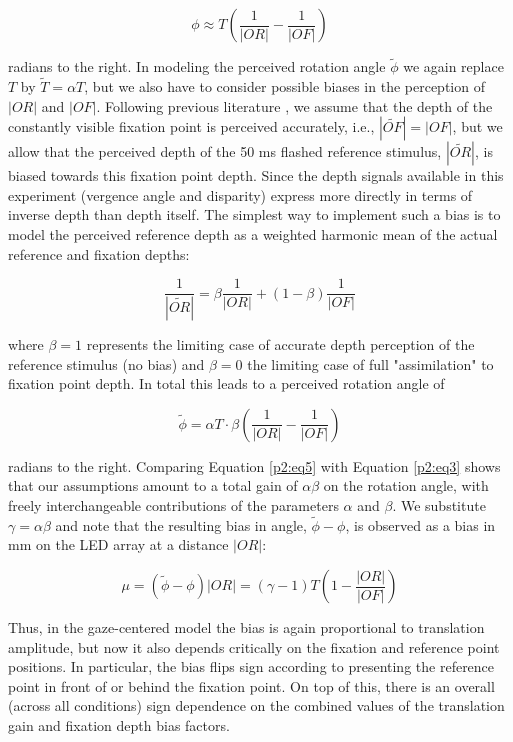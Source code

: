 \begin{equation}
\label{p2:eq3}
\phi \approx T (\frac{1}{|OR|} - \frac{1}{|OF|})
\end{equation}

radians to the right. In modeling the perceived rotation angle $\tilde{\phi}$ we again replace $T$ by $\tilde{T} = {\alpha}T$, but we also have to consider possible biases in the perception of $|OR|$ and $|OF|$. Following previous literature \cite{gogel1977, medendorp2003b}, we assume that the depth of the constantly visible fixation point is perceived accurately, i.e., $|\tilde{OF}| = |OF|$, but we allow that the perceived depth of the 50 ms flashed reference stimulus, $|\tilde{OR}|$, is biased towards this fixation point depth. Since the depth signals available in this experiment (vergence angle and disparity) express more directly in terms of inverse depth than depth itself. The simplest way to implement such a bias is to model the perceived reference depth as a weighted harmonic mean of the actual reference and fixation depths:

\begin{equation}
\label{p2:eq4}
\frac{1}{|\tilde{OR}|} = \beta \frac{1}{|OR|} + (1 - \beta) \frac{1}{|OF|}
\end{equation}

where $\beta = 1$ represents the limiting case of accurate depth perception of the reference stimulus (no bias) and $\beta = 0$ the limiting case of full "assimilation" to fixation point depth. In total this leads to a perceived rotation angle of

\begin{equation}
\label{p2:eq5}
\tilde{\phi} = {\alpha}T \cdot \beta(\frac{1}{|OR|} - \frac{1}{|OF|})
\end{equation}

radians to the right. Comparing Equation \ref{p2:eq5} with Equation \ref{p2:eq3} shows that our assumptions amount to a total gain of $\alpha\beta$ on the rotation angle, with freely interchangeable contributions of the parameters $\alpha$ and $\beta$. We substitute $\gamma = \alpha\beta$ and note that the resulting bias in angle, $\tilde{\phi} - \phi$, is observed as a bias in mm on the LED array at a distance $|OR|$:

\begin{equation}
\label{p2:eq6}
\mu = (\tilde{\phi} - \phi)|OR| = (\gamma - 1)T(1 - \frac{|OR|}{|OF|})
\end{equation}

Thus, in the gaze-centered model the bias is again proportional to translation amplitude, but now it also depends critically on the fixation and reference point positions. In particular, the bias flips sign according to presenting the reference point in front of or behind the fixation point. On top of this, there is an overall (across all conditions) sign dependence on the combined values of the translation gain and fixation depth bias factors.

